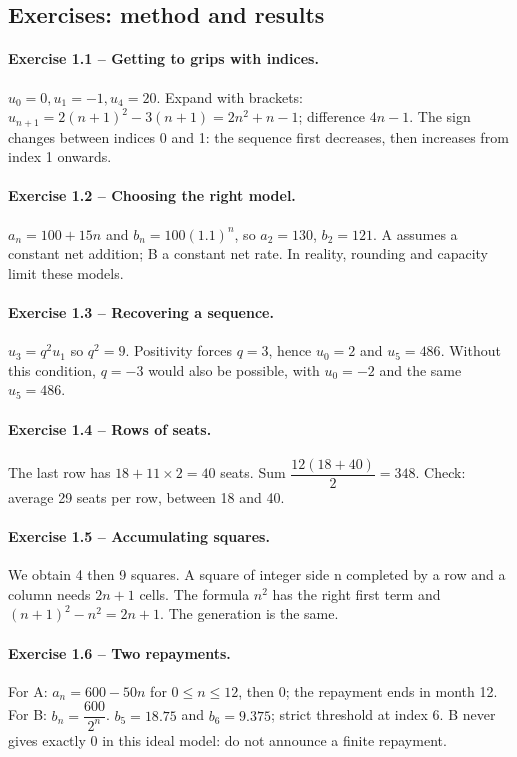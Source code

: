 \subsection*{Exercises: method and results}
\paragraph{Exercise 1.1 -- Getting to grips with indices.} $u_0=0,u_1=-1,u_4=20$. Expand with brackets: $u_{n+1}=2(n+1)^2-3(n+1)=2n^2+n-1$; difference $4n-1$. The sign changes between indices 0 and 1: the sequence first decreases, then increases from index 1 onwards.
\paragraph{Exercise 1.2 -- Choosing the right model.} $a_n=100+15n$ and $b_n=100(\num{1,1})^n$, so $a_2=130$, $b_2=121$. A assumes a constant net addition; B a constant net rate. In reality, rounding and capacity limit these models.
\paragraph{Exercise 1.3 -- Recovering a sequence.} $u_3=q^2u_1$ so $q^2=9$. Positivity forces $q=3$, hence $u_0=2$ and $u_5=486$. Without this condition, $q=-3$ would also be possible, with $u_0=-2$ and the same $u_5=486$.
\paragraph{Exercise 1.4 -- Rows of seats.} The last row has $18+11\times2=40$ seats. Sum $\dfrac{12(18+40)}{2}=348$. Check: average 29 seats per row, between 18 and 40.
\paragraph{Exercise 1.5 -- Accumulating squares.} We obtain 4 then 9 squares. A square of integer side n completed by a row and a column needs $2n+1$ cells. The formula $n^2$ has the right first term and $ (n+1)^2-n^2=2n+1$. The generation is the same.
\paragraph{Exercise 1.6 -- Two repayments.} For A: $a_n=600-50n$ for $0\leq n\leq12$, then 0; the repayment ends in month 12. For B: $b_n=\dfrac{600}{2^n}$. $b_5=\num{18,75}$ and $b_6=\num{9,375}$; strict threshold at index 6. B never gives exactly 0 in this ideal model: do not announce a finite repayment.
